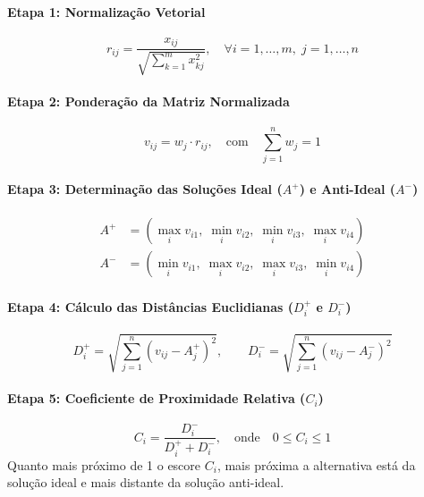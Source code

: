 \documentclass[12pt,a4paper]{article}
\begin{document}
\paragraph{Etapa 1: Normalização Vetorial}
\begin{equation}
    r_{ij} = \frac{x_{ij}}{\sqrt{\sum_{k=1}^{m} x_{kj}^2}}, \quad \forall i=1,\dots,m, \; j=1,\dots,n
\end{equation}

\paragraph{Etapa 2: Ponderação da Matriz Normalizada}
\begin{equation}
    v_{ij} = w_j \cdot r_{ij}, \quad \text{com} \quad \sum_{j=1}^{n} w_j = 1
\end{equation}

\paragraph{Etapa 3: Determinação das Soluções Ideal ($A^+$) e Anti-Ideal ($A^-$)}
\begin{align}
    A^+ &= \left( \max_i v_{i1}, \; \min_i v_{i2}, \; \min_i v_{i3}, \; \max_i v_{i4} \right) \\
    A^- &= \left( \min_i v_{i1}, \; \max_i v_{i2}, \; \max_i v_{i3}, \; \min_i v_{i4} \right)
\end{align}

\paragraph{Etapa 4: Cálculo das Distâncias Euclidianas ($D_i^+$ e $D_i^-$)}
\begin{equation}
    D_i^+ = \sqrt{\sum_{j=1}^{n} (v_{ij} - A_j^+)^2}, \qquad D_i^- = \sqrt{\sum_{j=1}^{n} (v_{ij} - A_j^-)^2}
\end{equation}

\paragraph{Etapa 5: Coeficiente de Proximidade Relativa ($C_i$)}
\begin{equation}
    C_i = \frac{D_i^-}{D_i^+ + D_i^-}, \quad \text{onde} \quad 0 \le C_i \le 1
\end{equation}
Quanto mais próximo de 1 o escore $C_i$, mais próxima a alternativa está da solução ideal e mais distante da solução anti-ideal.
\end{document}
